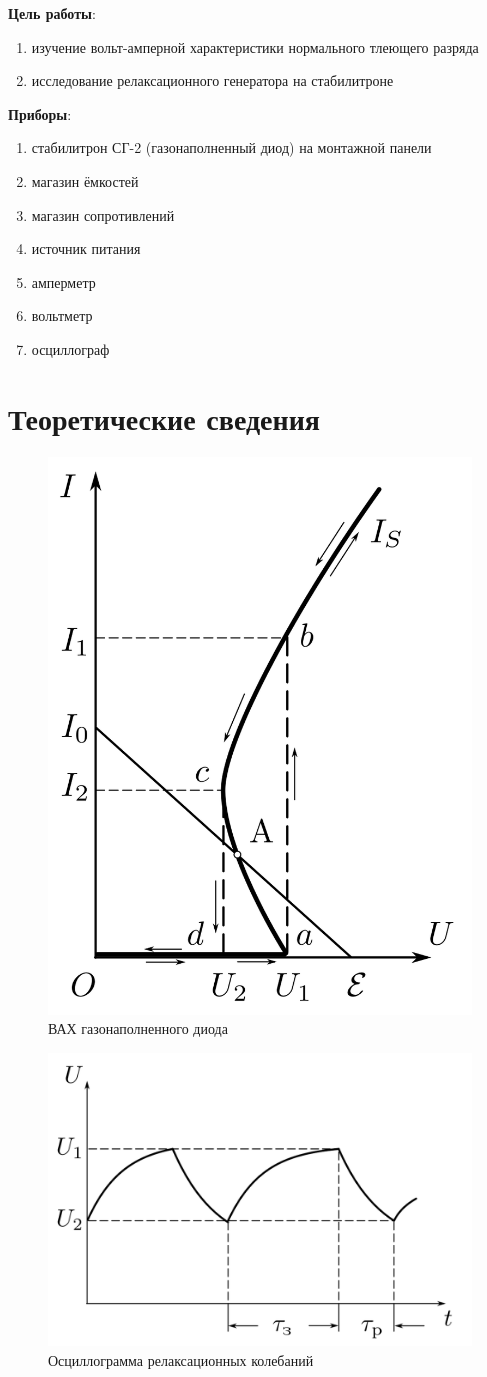 \documentclass{report}
\begin{document}
\graphicspath{{figures}}



\textbf{Цель работы}:
\begin{enumerate}
	\item изучение вольт-амперной характеристики нормального тлеющего разряда
	\item исследование релаксационного генератора на стабилитроне
\end{enumerate}

\textbf{Приборы}:
\begin{enumerate}
	\item стабилитрон СГ-2 (газонаполненный диод) на монтажной панели
	\item магазин ёмкостей
	\item магазин сопротивлений
	\item источник питания
	\item амперметр
	\item вольтметр
	\item осциллограф
\end{enumerate}

\section{Теоретические сведения}

\begin{figure}[H]
	\centering
	\includegraphics[width=0.4\linewidth]{VAH2}
	\caption{ВАХ газонаполненного диода}
	\label{fig:VAH}
\end{figure}

\begin{figure}[H]
	\centering
	\includegraphics[width=0.4\linewidth]{U1}
	\caption{Осциллограмма релаксационных колебаний}
	\label{fig:VAH}
\end{figure}
\end{document}
